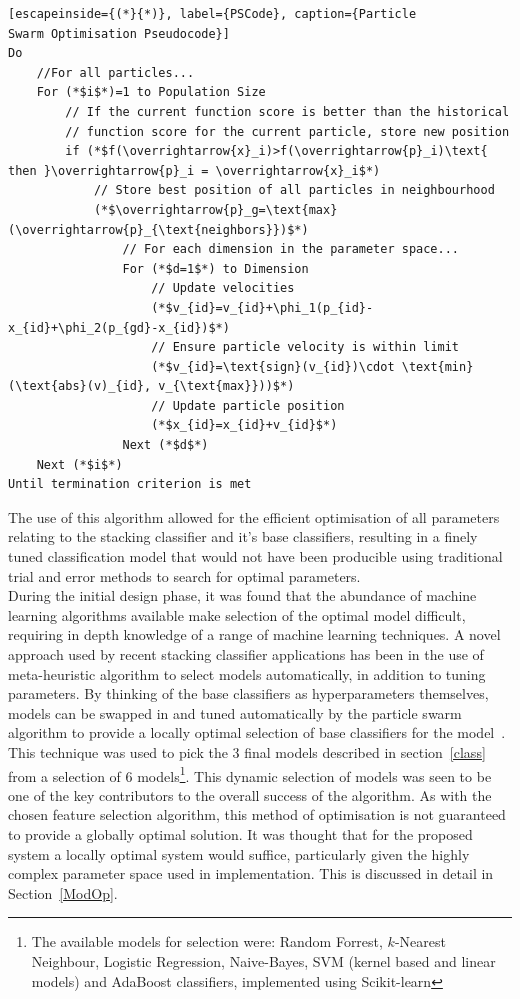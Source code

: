 \documentclass[titlepage, 12pt]{scrartcl} \usepackage{enumitem}
\begin{document}
\onehalfspacing
\begin{lstlisting}[escapeinside={(*}{*)}, label={PSCode}, caption={Particle
Swarm Optimisation Pseudocode}]
Do
    //For all particles...
    For (*$i$*)=1 to Population Size
        // If the current function score is better than the historical
        // function score for the current particle, store new position
        if (*$f(\overrightarrow{x}_i)>f(\overrightarrow{p}_i)\text{ then }\overrightarrow{p}_i = \overrightarrow{x}_i$*)
            // Store best position of all particles in neighbourhood
            (*$\overrightarrow{p}_g=\text{max}(\overrightarrow{p}_{\text{neighbors}})$*)
                // For each dimension in the parameter space...
                For (*$d=1$*) to Dimension
                    // Update velocities
                    (*$v_{id}=v_{id}+\phi_1(p_{id}-x_{id}+\phi_2(p_{gd}-x_{id})$*)
                    // Ensure particle velocity is within limit
                    (*$v_{id}=\text{sign}(v_{id})\cdot \text{min}(\text{abs}(v)_{id}, v_{\text{max}}))$*)
                    // Update particle position
                    (*$x_{id}=x_{id}+v_{id}$*)
                Next (*$d$*)
    Next (*$i$*)
Until termination criterion is met
\end{lstlisting}
\doublespacing

The use of this algorithm allowed for the efficient optimisation of all
parameters relating to the stacking classifier and it's base classifiers,
resulting in a finely tuned classification model that would not have been
producible using traditional trial and error methods to search for optimal
parameters.\\ 
During the initial design phase, it was found that the abundance
of machine learning algorithms available make selection of the optimal model
difficult, requiring in depth knowledge of a range of machine learning
techniques. A novel approach used by recent stacking classifier applications
has been in the use of meta-heuristic algorithm to select models automatically,
in addition to tuning parameters. By thinking of the base classifiers as
hyperparameters themselves, models can be swapped in and tuned automatically by
the particle swarm algorithm to provide a locally optimal selection of base
classifiers for the model~\parencite{Sesmero2015}. This technique was used to
pick the 3 final models described in section~\ref{class} from a selection of 6
models\footnote{The available models for selection were: Random Forrest,
$k$-Nearest Neighbour, Logistic Regression, Naive-Bayes, SVM (kernel based and
linear models) and AdaBoost classifiers, implemented using Scikit-learn}. This
dynamic selection of models was seen to be one of the key contributors to the
overall success of the algorithm. As with the chosen feature selection
algorithm, this method of optimisation is not guaranteed to provide a globally
optimal solution. It was thought that for the proposed system a locally optimal
system would suffice, particularly given the highly complex parameter space
used in implementation. This is discussed in detail in Section~\ref{ModOp}.
\end{document}
